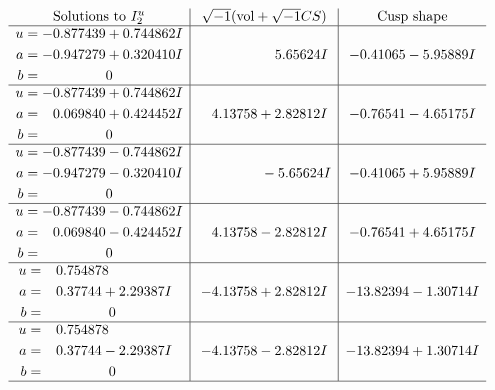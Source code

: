 \documentclass[1p]{elsarticle_modified}
\theoremstyle{definition}
\newcommand{\I}{\sqrt{-1}}
\begin{document}
$$\begin{array}{c|c|c}  
\text{Solutions to }I^u_{2}& \I (\text{vol} + \sqrt{-1}CS) & \text{Cusp shape}\\
 \hline 
\begin{aligned}
u &= -0.877439 + 0.744862 I \\
a &= -0.947279 + 0.320410 I \\
b &= \phantom{-0.000000 } 0\end{aligned}
 & \phantom{-0.000000 -}5.65624 I & -0.41065 - 5.95889 I \\ \hline\begin{aligned}
u &= -0.877439 + 0.744862 I \\
a &= \phantom{-}0.069840 + 0.424452 I \\
b &= \phantom{-0.000000 } 0\end{aligned}
 & \phantom{-}4.13758 + 2.82812 I & -0.76541 - 4.65175 I \\ \hline\begin{aligned}
u &= -0.877439 - 0.744862 I \\
a &= -0.947279 - 0.320410 I \\
b &= \phantom{-0.000000 } 0\end{aligned}
 & \phantom{-0.000000 } -5.65624 I & -0.41065 + 5.95889 I \\ \hline\begin{aligned}
u &= -0.877439 - 0.744862 I \\
a &= \phantom{-}0.069840 - 0.424452 I \\
b &= \phantom{-0.000000 } 0\end{aligned}
 & \phantom{-}4.13758 - 2.82812 I & -0.76541 + 4.65175 I \\ \hline\begin{aligned}
u &= \phantom{-}0.754878\phantom{ +0.000000I} \\
a &= \phantom{-}0.37744 + 2.29387 I \\
b &= \phantom{-0.000000 } 0\end{aligned}
 & -4.13758 + 2.82812 I & -13.82394 - 1.30714 I \\ \hline\begin{aligned}
u &= \phantom{-}0.754878\phantom{ +0.000000I} \\
a &= \phantom{-}0.37744 - 2.29387 I \\
b &= \phantom{-0.000000 } 0\end{aligned}
 & -4.13758 - 2.82812 I & -13.82394 + 1.30714 I\\
 \hline 
 \end{array}$$\newpage\newpage\renewcommand{\arraystretch}{1}
\end{document}
